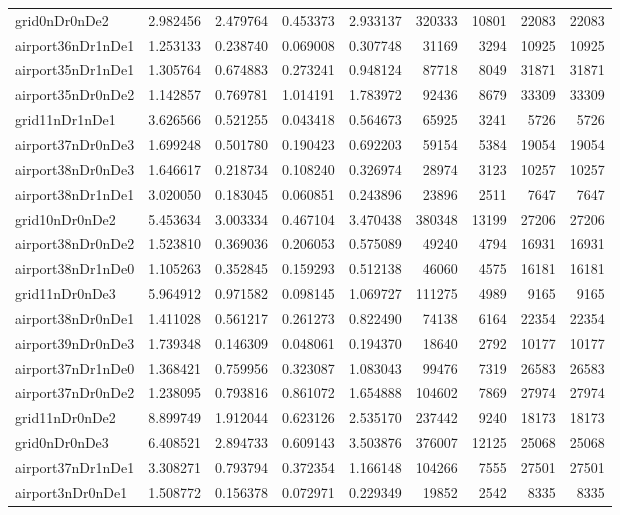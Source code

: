 \documentclass[../../../thesis.tex]{subfiles}
\begin{document}
\begin{longtable}{|l|r|r|r|r|r|r|r|r|}
grid0nDr0nDe2 & 2.982456 & 2.479764 & 0.453373 & 2.933137 & 320333 & 10801 & 22083 & 22083 \\
airport36nDr1nDe1 & 1.253133 & 0.238740 & 0.069008 & 0.307748 & 31169 & 3294 & 10925 & 10925 \\
airport35nDr1nDe1 & 1.305764 & 0.674883 & 0.273241 & 0.948124 & 87718 & 8049 & 31871 & 31871 \\
airport35nDr0nDe2 & 1.142857 & 0.769781 & 1.014191 & 1.783972 & 92436 & 8679 & 33309 & 33309 \\
grid11nDr1nDe1 & 3.626566 & 0.521255 & 0.043418 & 0.564673 & 65925 & 3241 & 5726 & 5726 \\
airport37nDr0nDe3 & 1.699248 & 0.501780 & 0.190423 & 0.692203 & 59154 & 5384 & 19054 & 19054 \\
airport38nDr0nDe3 & 1.646617 & 0.218734 & 0.108240 & 0.326974 & 28974 & 3123 & 10257 & 10257 \\
airport38nDr1nDe1 & 3.020050 & 0.183045 & 0.060851 & 0.243896 & 23896 & 2511 & 7647 & 7647 \\
grid10nDr0nDe2 & 5.453634 & 3.003334 & 0.467104 & 3.470438 & 380348 & 13199 & 27206 & 27206 \\
airport38nDr0nDe2 & 1.523810 & 0.369036 & 0.206053 & 0.575089 & 49240 & 4794 & 16931 & 16931 \\
airport38nDr1nDe0 & 1.105263 & 0.352845 & 0.159293 & 0.512138 & 46060 & 4575 & 16181 & 16181 \\
grid11nDr0nDe3 & 5.964912 & 0.971582 & 0.098145 & 1.069727 & 111275 & 4989 & 9165 & 9165 \\
airport38nDr0nDe1 & 1.411028 & 0.561217 & 0.261273 & 0.822490 & 74138 & 6164 & 22354 & 22354 \\
airport39nDr0nDe3 & 1.739348 & 0.146309 & 0.048061 & 0.194370 & 18640 & 2792 & 10177 & 10177 \\
airport37nDr1nDe0 & 1.368421 & 0.759956 & 0.323087 & 1.083043 & 99476 & 7319 & 26583 & 26583 \\
airport37nDr0nDe2 & 1.238095 & 0.793816 & 0.861072 & 1.654888 & 104602 & 7869 & 27974 & 27974 \\
grid11nDr0nDe2 & 8.899749 & 1.912044 & 0.623126 & 2.535170 & 237442 & 9240 & 18173 & 18173 \\
grid0nDr0nDe3 & 6.408521 & 2.894733 & 0.609143 & 3.503876 & 376007 & 12125 & 25068 & 25068 \\
airport37nDr1nDe1 & 3.308271 & 0.793794 & 0.372354 & 1.166148 & 104266 & 7555 & 27501 & 27501 \\
airport3nDr0nDe1 & 1.508772 & 0.156378 & 0.072971 & 0.229349 & 19852 & 2542 & 8335 & 8335 \\

\end{longtable}
\end{document}
